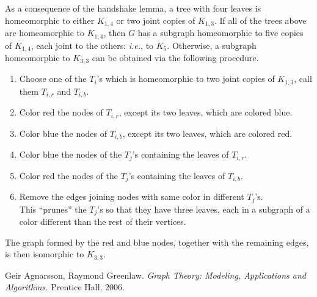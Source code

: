 \documentclass[12pt]{article}
\newcommand{\ie}{\textit{i.e.}}
\begin{document}
As a consequence of the handshake lemma,
a tree with four leaves is homeomorphic to either $K_{1,4}$
or two joint copies of $K_{1,3}$.
If all of the trees above are homeomorphic to $K_{1,4}$,
then $G$ has a subgraph homeomorphic to
five copies of $K_{1,4}$, each joint to the others:
\ie, to $K_5$.
Otherwise, a subgraph homeomorphic to $K_{3,3}$
can be obtained via the following procedure.
\begin{enumerate}
\item
Choose one of the $T_i$'s
which is homeomorphic to two joint copies of $K_{1,3}$,
call them $T_{i,r}$ and $T_{i,b}$.
\item
Color red the nodes of $T_{i,r}$,
except its two leaves, which are colored blue.
\item
Color blue the nodes of $T_{i,b}$,
except its two leaves, which are colored red.
\item
Color blue the nodes of the $T_j$'s
containing the leaves of $T_{i,r}$.
\item
Color red the nodes of the $T_j$'s
containing the leaves of $T_{i,b}$.
\item
Remove the edges joining nodes with same color in different $T_j$'s.
\\
This ``prunes'' the $T_j$'s so that they have three leaves,
each in a subgraph of a color different than the rest of their vertices.
\end{enumerate}
The graph formed by the red and blue nodes,
together with the remaining edges,
is then isomorphic to $K_{3,3}$.

\begin{thebibliography}{99}

Geir Agnarsson, Raymond Greenlaw.
\textit{Graph Theory: Modeling, Applications and Algorithms.}
Prentice Hall, 2006.

\end{thebibliography}
\end{document}
